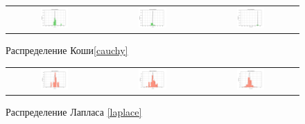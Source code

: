 ﻿\documentclass[12pt,a4paper]{article}
\begin{document}
\begin{figure}[H]
    \centering
    \begin{tabular}{c c c}
        \includegraphics[height = 0.25\textheight, width = 0.31\textwidth]{Cauchy_10.png}
        & \includegraphics[height = 0.25\textheight, width = 0.31\textwidth]{Cauchy_50.png}
        & \includegraphics[height = 0.25\textheight, width = 0.31\textwidth]{Cauchy_1000.png}
    \end{tabular}
    \caption{Распределение Коши\eqref{cauchy}}
    \label{fig:cauchy}
\end{figure}

\begin{figure}[H]
    \centering
    \begin{tabular}{c c c}
        \includegraphics[height = 0.25\textheight, width = 0.31\textwidth]{Laplace_10.png}
        & \includegraphics[height = 0.25\textheight, width = 0.31\textwidth]{Laplace_50.png}
        & \includegraphics[height = 0.25\textheight, width = 0.31\textwidth]{Laplace_1000.png}
    \end{tabular}
    \caption{Распределение Лапласа \eqref{laplace}}
    \label{fig:laplace}
\end{figure}
\end{document}
